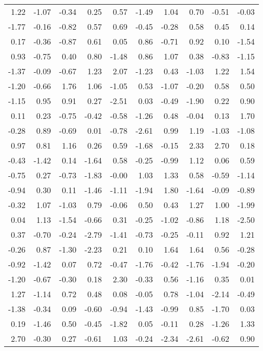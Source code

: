 \documentclass{article}\usepackage[]{graphicx}\usepackage[]{color}
\begin{document}
\begin{longtable}{rrrrrrrrrr}
  1.22 & -1.07 & -0.34 & 0.25 & 0.57 & -1.49 & 1.04 & 0.70 & -0.51 & -0.03 \\ 
  -1.77 & -0.16 & -0.82 & 0.57 & 0.69 & -0.45 & -0.28 & 0.58 & 0.45 & 0.14 \\ 
  0.17 & -0.36 & -0.87 & 0.61 & 0.05 & 0.86 & -0.71 & 0.92 & 0.10 & -1.54 \\ 
  0.93 & -0.75 & 0.40 & 0.80 & -1.48 & 0.86 & 1.07 & 0.38 & -0.83 & -1.15 \\ 
  -1.37 & -0.09 & -0.67 & 1.23 & 2.07 & -1.23 & 0.43 & -1.03 & 1.22 & 1.54 \\ 
  -1.20 & -0.66 & 1.76 & 1.06 & -1.05 & 0.53 & -1.07 & -0.20 & 0.58 & 0.50 \\ 
  -1.15 & 0.95 & 0.91 & 0.27 & -2.51 & 0.03 & -0.49 & -1.90 & 0.22 & 0.90 \\ 
  0.11 & 0.23 & -0.75 & -0.42 & -0.58 & -1.26 & 0.48 & -0.04 & 0.13 & 1.70 \\ 
  -0.28 & 0.89 & -0.69 & 0.01 & -0.78 & -2.61 & 0.99 & 1.19 & -1.03 & -1.08 \\ 
  0.97 & 0.81 & 1.16 & 0.26 & 0.59 & -1.68 & -0.15 & 2.33 & 2.70 & 0.18 \\ 
  -0.43 & -1.42 & 0.14 & -1.64 & 0.58 & -0.25 & -0.99 & 1.12 & 0.06 & 0.59 \\ 
  -0.75 & 0.27 & -0.73 & -1.83 & -0.00 & 1.03 & 1.33 & 0.58 & -0.59 & -1.14 \\ 
  -0.94 & 0.30 & 0.11 & -1.46 & -1.11 & -1.94 & 1.80 & -1.64 & -0.09 & -0.89 \\ 
  -0.32 & 1.07 & -1.03 & 0.79 & -0.06 & 0.50 & 0.43 & 1.27 & 1.00 & -1.99 \\ 
  0.04 & 1.13 & -1.54 & -0.66 & 0.31 & -0.25 & -1.02 & -0.86 & 1.18 & -2.50 \\ 
  0.37 & -0.70 & -0.24 & -2.79 & -1.41 & -0.73 & -0.25 & -0.11 & 0.92 & 1.21 \\ 
  -0.26 & 0.87 & -1.30 & -2.23 & 0.21 & 0.10 & 1.64 & 1.64 & 0.56 & -0.28 \\ 
  -0.92 & -1.42 & 0.07 & 0.72 & -0.47 & -1.76 & -0.42 & -1.76 & -1.94 & -0.20 \\ 
  -1.20 & -0.67 & -0.30 & 0.18 & 2.30 & -0.33 & 0.56 & -1.16 & 0.35 & 0.01 \\ 
  1.27 & -1.14 & 0.72 & 0.48 & 0.08 & -0.05 & 0.78 & -1.04 & -2.14 & -0.49 \\ 
  -1.38 & -0.34 & 0.09 & -0.60 & -0.94 & -1.43 & -0.99 & 0.85 & -1.70 & 0.03 \\ 
  0.19 & -1.46 & 0.50 & -0.45 & -1.82 & 0.05 & -0.11 & 0.28 & -1.26 & 1.33 \\ 
  2.70 & -0.30 & 0.27 & -0.61 & 1.03 & -0.24 & -2.34 & -2.61 & -0.62 & 0.90 \\ 
   \hline
\hline
\end{longtable}
\end{document}
